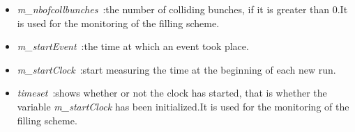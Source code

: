 \begin{itemize}
\item \textit{m\_nbofcollbunches}~:the number of colliding bunches, if it is greater than 0.It is used for the monitoring of the filling scheme.\par
\item \textit{m\_startEvent}~:the time at which an event took place.\par
\item \textit{m\_startClock}~:start measuring the time at the beginning of each new run.\par
\item \textit{timeset}~:shows whether or not the clock has started, that is whether the variable \textit{m\_startClock} has been initialized.It is used for the monitoring of the filling scheme.\par



\end{itemize}

